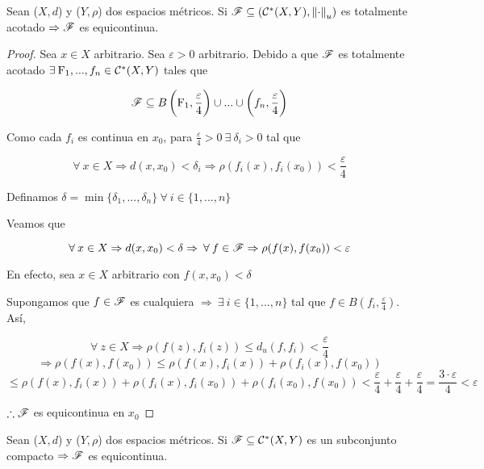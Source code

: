 \begin{theorem} \label{theom518}
    Sean ($X,d$) y ($Y, \rho$) dos espacios métricos. Si $\mathscr{F} \subseteq ({\mathcal{C}}^{\ast}(X,Y),{\norm{\cdot}}_{u})$ es totalmente acotado $\Rightarrow \mathscr{F}$ es equicontinua.
\end{theorem}

\begin{proof}
    Sea $x \in X$ arbitrario. Sea $\varepsilon > 0$ arbitrario. Debido a que $\mathscr{F}$ es totalmente acotado $\exists \: \mathrm{F}_1, ..., f_n \in {\ensuremath{\mathcal{C}}}^{\ast}(X,Y)$ tales que

    $$\mathscr{F} \subseteq B \left( \mathrm{F}_1, \frac{\varepsilon}{4}\right) \cup ... \cup \left( f_n, \frac{\varepsilon}{4}\right)$$

    Como cada $f_i$ es continua en $x_0$, para $\frac{\varepsilon}{4} > 0 \: \exists \: \delta_i > 0$ tal que

    $$\forall \: x \in X \Rightarrow d(x,x_0) < \delta_i \Rightarrow \rho(f_i(x),f_i(x_0)) < \frac{\varepsilon}{4}$$

    Definamos $\delta = \min \{ \delta_1, ..., \delta_n \} \: \forall \: i \in \{ 1, ..., n \}$

    Veamos que
    
    $$\forall \: x \in X \Rightarrow d(x,x_0) < \delta \Rightarrow \: \forall \: f \in \mathscr{F} \Rightarrow \rho(f(x),f(x_0)) < \varepsilon$$

    En efecto, sea $x \in X$ arbitrario con $f(x,x_0) < \delta$

    Supongamos que $f \in \mathscr{F}$ es cualquiera $\Rightarrow \: \exists \: i \in \{1, ..., n \}$ tal que $f \in B \left( f_i, \frac{\varepsilon}{4}\right)$. Así,

    $$\forall \: z \in X \Rightarrow \rho(f(z),f_i(z)) \leqslant d_u(f,f_i) < \frac{\varepsilon}{4}$$
    $$\Rightarrow \rho(f(x),f(x_0)) \leqslant \rho(f(x),f_i(x))+\rho(f_i(x),f(x_0))$$
    $$\leqslant \rho(f(x),f_i(x))+\rho(f_i(x),f_i(x_0)) + \rho(f_i(x_0),f(x_0)) <  \frac{\varepsilon}{4} +  \frac{\varepsilon}{4} +  \frac{\varepsilon}{4} =  \frac{3 \cdot \varepsilon}{4} < \varepsilon$$

    $\therefore \mathscr{F}$ es equicontinua en $x_0$
\end{proof}

\begin{corollary}
    Sean ($X,d$) y ($Y,\rho$) dos espacios métricos. Si $\mathscr{F} \subseteq {\ensuremath{\mathcal{C}}}^{\ast}(X,Y)$ es un subconjunto compacto $\Rightarrow \mathscr{F}$ es equicontinua.
\end{corollary}

